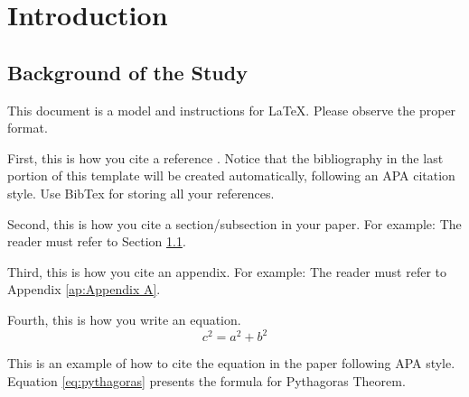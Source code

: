\renewcommand{\thechapter}{\Roman{chapter}}
\chapter{Introduction}
    \thispagestyle{empty} 
    \label{ch:Introduction}
    \renewcommand{\thechapter}{\arabic{chapter}}



\section{Background of the Study}
    \label{sec:Background of the Study}

    This document is a model and instructions for \LaTeX.  Please observe the proper format.

    First, this is how you cite a reference \citep{aleluya2018decision}. Notice that the bibliography in the last portion of this template will be created automatically, following an APA citation style. Use BibTex for storing all your references.

    Second, this is how you cite a section/subsection in your paper. For example: The reader must refer to Section \ref{sec:Background of the Study}.

    Third, this is how you cite an appendix. For example: The reader must refer to Appendix \ref{ap:Appendix A}.

    Fourth, this is how you write an equation.
        \begin{equation}
            \label{eq:pythagoras}
            c^2 = a^2+b^2
        \end{equation}
    
    This is an example of how to cite the equation in the paper following APA style. Equation \ref{eq:pythagoras} presents the formula for Pythagoras Theorem.
    

